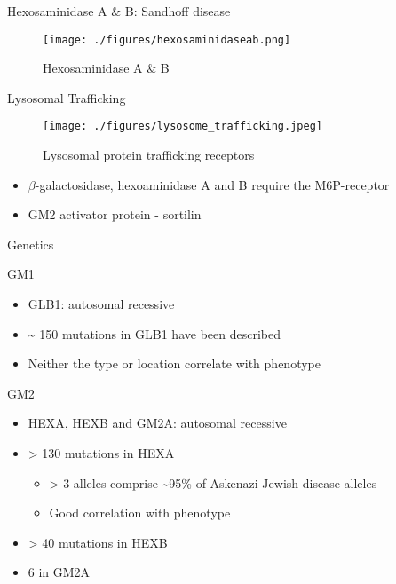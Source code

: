 \documentclass[presentation, smaller]{beamer}
\begin{document}
\begin{frame}[label={sec:orgheadline9}]{Hexosaminidase A \& B: Sandhoff disease}
\begin{figure}[htb]
\centering
\texttt{[image: ./figures/hexosaminidaseab.png]}
\caption[hexb]{\label{fig:hexb}
Hexosaminidase A \& B}
\end{figure}
\end{frame}


\begin{frame}[label={sec:orgheadline10}]{Lysosomal Trafficking}
\begin{figure}[htb]
\centering
\texttt{[image: ./figures/lysosome\_trafficking.jpeg]}
\caption[traf]{\label{fig:traf}
Lysosomal protein trafficking receptors}
\end{figure}

\footnotesize
\begin{itemize}
\item \(\beta\)-galactosidase, hexoaminidase A and B require the M6P-receptor
\item GM2 activator protein - sortilin
\end{itemize}
\end{frame}


\begin{frame}[label={sec:orgheadline11}]{Genetics}
\begin{block}{GM1}
\begin{itemize}
\item GLB1: autosomal recessive
\item \textasciitilde{} 150 mutations in GLB1 have been described
\item Neither the type or location correlate with phenotype
\end{itemize}
\end{block}

\begin{block}{GM2}
\begin{itemize}
\item HEXA, HEXB and GM2A: autosomal recessive
\item > 130 mutations in HEXA
\begin{itemize}
\item > 3 alleles comprise \textasciitilde{}95\% of Askenazi Jewish disease alleles
\item Good correlation with phenotype
\end{itemize}
\item > 40 mutations in HEXB
\item 6 in GM2A
\end{itemize}
\end{block}
\end{frame}
\end{document}
